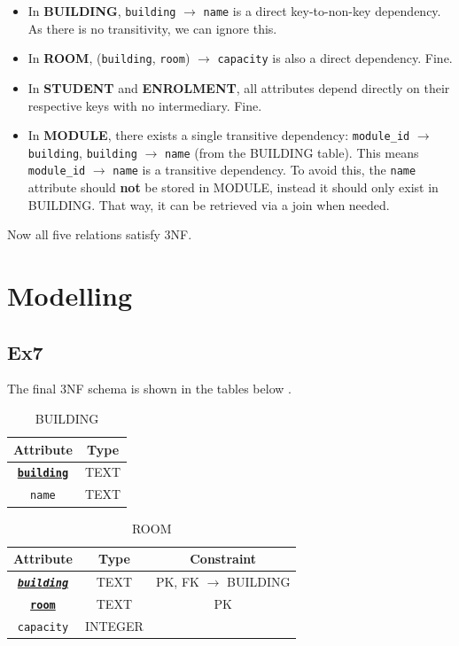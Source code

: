\documentclass[12pt, a4paper]{report}
\begin{document}
\begin{itemize}
    \item In \textbf{BUILDING}, \texttt{building} $\rightarrow$ \texttt{name} is a direct key-to-non-key dependency. As there is no transitivity, we can ignore this.
    \item In \textbf{ROOM}, (\texttt{building}, \texttt{room}) $\rightarrow$ \texttt{capacity} is also a direct dependency. Fine.
    \item In \textbf{STUDENT} and \textbf{ENROLMENT}, all attributes depend directly on their respective keys with no intermediary. Fine.
    \item In \textbf{MODULE}, there exists a single transitive dependency: \texttt{module\_id} $\rightarrow$ \texttt{building}, \texttt{building} $\rightarrow$ \texttt{name} (from the BUILDING table). This means \texttt{module\_id} $\rightarrow$ \texttt{name} is a transitive dependency. To avoid this, the \texttt{name} attribute should \textbf{not} be stored in MODULE, instead it should only exist in BUILDING. That way, it can be retrieved via a join when needed.
\end{itemize}

Now all five relations satisfy 3NF.












\section{Modelling}
\subsection{Ex7}

The final 3NF schema is shown in the tables below \cite{overleaf_crossref}.

\begin{table}[H]
\centering
\begin{tabular}{c|c}
\textbf{Attribute} & \textbf{Type} \\\hline
\textbf{\underline{\texttt{building}}} & TEXT \\
\texttt{name} & TEXT \\
\end{tabular}
\caption{BUILDING}
\label{tab:building}
\end{table}

\begin{table}[H]
\centering
\begin{tabular}{c|c|c}
\textbf{Attribute} & \textbf{Type} & \textbf{Constraint} \\\hline
\textbf{\underline{\textit{\texttt{building}}}} & TEXT & PK, FK $\rightarrow$ BUILDING \\
\textbf{\underline{\texttt{room}}} & TEXT & PK \\
\texttt{capacity} & INTEGER & \\
\end{tabular}
\caption{ROOM}
\label{tab:room}
\end{table}
\end{document}
